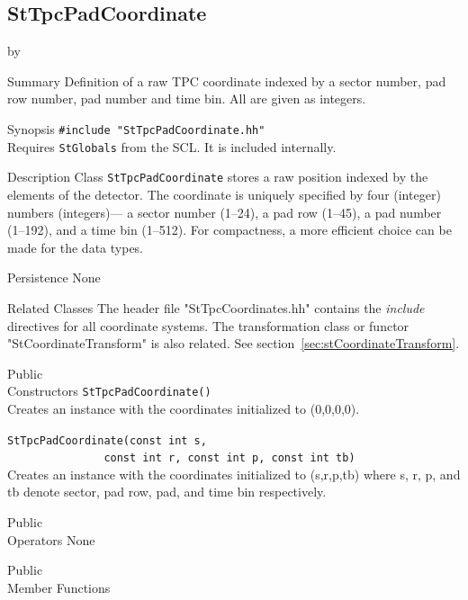 \documentclass[twoside]{article}
\newcommand{\comp}[1]{\texttt{#1}}%
\newcommand{\entrylabel}[1]{\mbox{\textbf{{#1}}}\hfil}%
\newenvironment{entry}
{\begin{list}{}%
    {\renewcommand{\makelabel}{\entrylabel}%
     \setlength{\labelwidth}{90pt}%
     \setlength{\leftmargin}{\labelwidth}
     \advance\leftmargin by \labelsep%
      }%
    }%
  {\end{list}}
\newcommand{\Entrylabel}[1]%
{\raisebox{0pt}[1ex][0pt]{\makebox[\labelwidth][l]%
    {\parbox[t]{\labelwidth}{\hspace{0pt}\textbf{{#1}}}}}}
\newenvironment{Entry}%
{\renewcommand{\entrylabel}{\Entrylabel}\begin{entry}}%
  {\end{entry}}
\begin{document}
\subsection{StTpcPadCoordinate} 
\label{sec:rawCoordinate}

\begin{Entry}
\item[Summary]
  Definition of a raw TPC coordinate indexed by a sector number,
  pad row number, pad number and time bin.  All are given as 
  integers.

\item[Synopsis]
  \verb+#include "StTpcPadCoordinate.hh"+\\
  Requires \comp{StGlobals} from the SCL.   It
  is included internally.

\item[Description]
Class \comp{StTpcPadCoordinate} stores a raw position indexed by the 
elements of the detector.  The coordinate is uniquely specified
by four (integer) numbers (integers)--- a sector number (1--24),
a pad row (1--45), a pad number (1--192), and a time bin (1--512).
For compactness, a more efficient choice can be made for the data
types.

\item[Persistence]
   None

\item[Related Classes]
The header file "StTpcCoordinates.hh" contains the {\em include}
directives for all coordinate systems.  The transformation class or
functor "StCoordinateTransform" is also related.  See 
section~\ref{sec:stCoordinateTransform}.

\item[Public \\ Constructors]
   \verb+StTpcPadCoordinate()+\\
   Creates an instance with the coordinates initialized to (0,0,0,0).

   \verb+StTpcPadCoordinate(const int s,+\\
   \verb+               const int r, const int p, const int tb)+\\
   Creates an instance with the coordinates initialized to (s,r,p,tb)
   where s, r, p, and tb denote sector, pad row, pad, and time bin
   respectively.

\item[Public \\ Operators]
   None

\item[Public \\ Member Functions]


\end{Entry}
\end{document}
